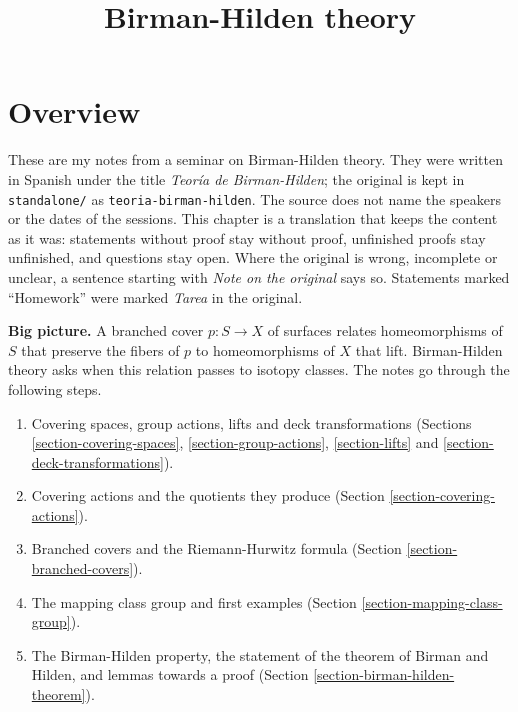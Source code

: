 



\title{Birman-Hilden theory}
\maketitle

\label{section-phantom}

\tableofcontents

\section{Overview}
\label{section-introduction}

\noindent
These are my notes from a seminar on
Birman-Hilden theory. They were written
in Spanish under the title
{\it Teor\'ia de Birman-Hilden}; the
original is kept in {\tt standalone/} as
{\tt teoria-birman-hilden}. The source
does not name the speakers or the dates
of the sessions. This chapter is a
translation that keeps the content as it
was: statements without proof stay
without proof, unfinished proofs stay
unfinished, and questions stay open.
Where the original is wrong, incomplete
or unclear, a sentence starting with
{\it Note on the original} says so.
Statements marked ``Homework'' were
marked {\it Tarea} in the original.

\medskip\noindent
{\bf Big picture.} A branched cover
$p:S\to X$ of surfaces relates
homeomorphisms of $S$ that preserve the
fibers of $p$ to homeomorphisms of $X$
that lift. Birman-Hilden theory asks
when this relation passes to isotopy
classes. The notes go through the
following steps.
\begin{enumerate}
\item Covering spaces, group actions,
lifts and deck transformations
(Sections
\ref{section-covering-spaces},
\ref{section-group-actions},
\ref{section-lifts} and
\ref{section-deck-transformations}).
\item Covering actions and the
quotients they produce
(Section \ref{section-covering-actions}).
\item Branched covers and the
Riemann-Hurwitz formula
(Section \ref{section-branched-covers}).
\item The mapping class group and first
examples
(Section
\ref{section-mapping-class-group}).
\item The Birman-Hilden property, the
statement of the theorem of Birman and
Hilden, and lemmas towards a proof
(Section
\ref{section-birman-hilden-theorem}).
\end{enumerate}

